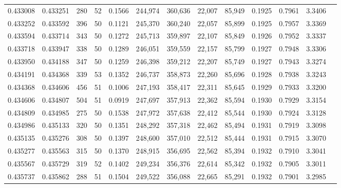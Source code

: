 \begin{tabular}{rrrrrrrrrrrrr}
0.433008 & 0.433251 &   280 &  52 &                                     0.1566 & 244,974 & 360,636 &  22,007 &  85,949 & 0.1925 & 0.7961 & 3.3406 \\
0.433252 & 0.433592 &   396 &  50 &                                     0.1121 & 245,370 & 360,240 &  22,057 &  85,899 & 0.1925 & 0.7957 & 3.3369 \\
0.433594 & 0.433714 &   343 &  50 &                                     0.1272 & 245,713 & 359,897 &  22,107 &  85,849 & 0.1926 & 0.7952 & 3.3337 \\
0.433718 & 0.433947 &   338 &  50 &                                     0.1289 & 246,051 & 359,559 &  22,157 &  85,799 & 0.1927 & 0.7948 & 3.3306 \\
0.433950 & 0.434188 &   347 &  50 &                                     0.1259 & 246,398 & 359,212 &  22,207 &  85,749 & 0.1927 & 0.7943 & 3.3274 \\
0.434191 & 0.434368 &   339 &  53 &                                     0.1352 & 246,737 & 358,873 &  22,260 &  85,696 & 0.1928 & 0.7938 & 3.3243 \\
0.434368 & 0.434606 &   456 &  51 &                                     0.1006 & 247,193 & 358,417 &  22,311 &  85,645 & 0.1929 & 0.7933 & 3.3200 \\
0.434606 & 0.434807 &   504 &  51 &                                     0.0919 & 247,697 & 357,913 &  22,362 &  85,594 & 0.1930 & 0.7929 & 3.3154 \\
0.434809 & 0.434985 &   275 &  50 &                                     0.1538 & 247,972 & 357,638 &  22,412 &  85,544 & 0.1930 & 0.7924 & 3.3128 \\
0.434986 & 0.435133 &   320 &  50 &                                     0.1351 & 248,292 & 357,318 &  22,462 &  85,494 & 0.1931 & 0.7919 & 3.3098 \\
0.435135 & 0.435276 &   308 &  50 &                                     0.1397 & 248,600 & 357,010 &  22,512 &  85,444 & 0.1931 & 0.7915 & 3.3070 \\
0.435277 & 0.435563 &   315 &  50 &                                     0.1370 & 248,915 & 356,695 &  22,562 &  85,394 & 0.1932 & 0.7910 & 3.3041 \\
0.435567 & 0.435729 &   319 &  52 &                                     0.1402 & 249,234 & 356,376 &  22,614 &  85,342 & 0.1932 & 0.7905 & 3.3011 \\
0.435737 & 0.435862 &   288 &  51 &                                     0.1504 & 249,522 & 356,088 &  22,665 &  85,291 & 0.1932 & 0.7901 & 3.2985 \\

\end{tabular}
